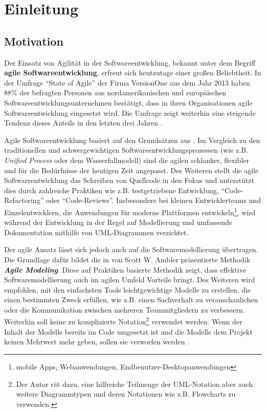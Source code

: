 
\chapter{Einleitung}
\label{chapter:introduction}

\section{Motivation}

Der Einsatz von Agilität in der Softwareentwicklung, bekannt unter dem Begriff \textbf{agile Softwareentwicklung}, erfreut sich heutzutage einer großen Beliebtheit. In der Umfrage \enquote{State of Agile} der Firma VersionOne aus dem Jahr 2013 haben 88\% der befragten Personen aus nordamerikanischen und europäischen Softwareentwicklungsunternehmen bestätigt, dass in ihren Organisationen agile Softwareentwicklung eingesetzt wird. Die Umfrage zeigt weiterhin eine steigende Tendenz dieses Anteils in den letzten drei Jahren \cite{VersionOne148th-Annual}.

Agile Softwareentwicklung basiert auf den Grundsätzen aus \cite{BeckBeedle01Manifest}. Im Vergleich zu den traditionellen und schwergewichtigen Softwareentwicklungsprozessen (wie z.B. \textit{Unified Process} oder dem Wasserfallmodell) sind die agilen schlanker, flexibler und für die Bedürfnisse der heutigen Zeit angepasst. Des Weiteren stellt die agile Softwareentwicklung das Schreiben von Quellcode in den Fokus und unterstützt dies durch zahlreiche Praktiken wie z.B. testgetriebene Entwicklung, \enquote{Code-Refactoring} oder \enquote{Code-Reviews}. Insbesondere bei kleinen Entwicklerteams und Einzelentwicklern, die Anwendungen für moderne Plattformen entwickeln\footnote{mobile Apps, Webanwendungen, Endbenutzer-Desktopanwendungen}, wird während der Entwicklung in der Regel auf Modellierung und umfassende Dokumentation mithilfe von UML-Dia\-gram\-men verzichtet.

Der agile Ansatz lässt sich jedoch auch auf die Softwaremodellierung übertragen. Die Grundlage dafür bildet die in \cite{Ambler02Agile} von Scott W. Ambler präsentierte Methodik \textbf{\textit{Agile Modeling}}. Diese auf Praktiken basierte Methodik zeigt, dass effektive Softwaremodellierung auch im agilen Umfeld Vorteile bringt. Des Weiteren wird empfohlen, mit den einfachsten Tools leichtgewichtige Modelle zu erstellen, die einen bestimmten Zweck erfüllen, wie z.B. einen Sachverhalt zu veranschaulichen oder die Kommunikation zwischen mehreren Teammitgliedern zu verbessern. Weiterhin soll keine zu komplizierte Notation\footnote{Der Autor rät dazu, eine hilfreiche Teilmenge der UML-Notation aber auch weitere Diagrammtypen und deren Notationen wie z.B. Flowcharts zu verwenden.} verwendet werden. Wenn der Inhalt der Modelle bereits im Code umgesetzt ist und die Modelle dem Projekt keinen Mehrwert mehr geben, sollen sie verworfen werden \cite{Ambler02Agile}.

